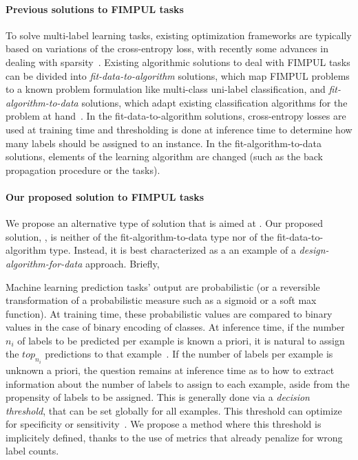 \paragraph{Previous solutions to FIMPUL tasks}
To solve multi-label learning tasks, existing optimization frameworks are typically based on variations of the cross-entropy loss, with recently some advances in dealing with sparsity~\citep[see, e.g.,][]{focalLoss,tencent}. 
Existing algorithmic solutions to deal with FIMPUL tasks can be divided into \emph{fit-data-to-algorithm} solutions, which map FIMPUL problems to a known problem formulation like multi-class uni-label classification, and \emph{fit-algorithm-to-data} solutions, which adapt existing classification algorithms for the problem at hand~\citep{multilabelMethods}. In the fit-data-to-algorithm solutions, cross-entropy losses are used at training time and thresholding is done at inference time to determine how many labels should be assigned to an instance. In the fit-algorithm-to-data solutions, elements of the learning algorithm are changed (such as the back propagation procedure or the tasks). 

\paragraph{Our proposed solution to FIMPUL tasks}
We propose an alternative type of solution that is aimed at . Our proposed solution, , is neither of the fit-algorithm-to-data type nor of the fit-data-to-algorithm type. 
Instead, it is best characterized as a an example of a \emph{design-algorithm-for-data} approach.
Briefly, 

Machine learning prediction tasks' output are probabilistic (or a reversible transformation of a probabilistic measure such as a sigmoid or a soft max function). At training time, these probabilistic values are compared to binary values in the case of binary encoding of classes. At inference time, if the number $n_i$ of labels to be predicted per example is known a priori, it is natural to assign the $top_{n_i}$ predictions to that example~\cite{lossTopKError, topKmulticlassSVM}. If the number of labels per example is unknown a priori, the question remains at inference time as to how to extract information about the number of labels to assign to each example, aside from the propensity of labels to be assigned. This is generally done via a \emph{decision threshold}, that can be set globally for all examples. This threshold can optimize for specificity or sensitivity~\cite{decisionThreshold}. We propose a method where this threshold is implicitely defined, thanks to the use of metrics that already penalize for wrong label counts.

